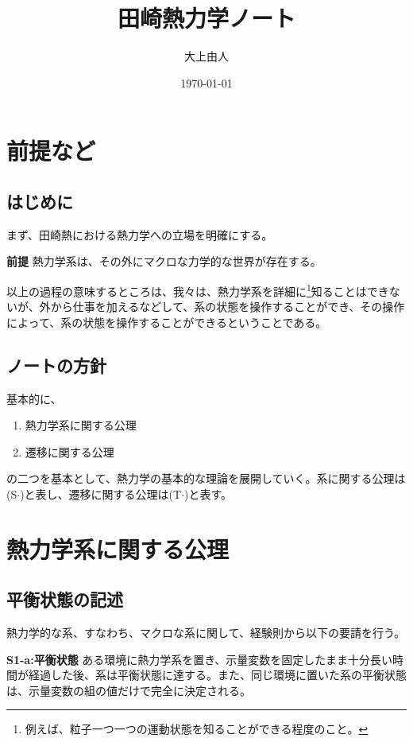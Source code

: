\documentclass[a4paper,11pt]{jsarticle}
\numberwithin{equation}{section}
\begin{document}
\title{田崎熱力学ノート}
\author{大上由人}
\date{\today}
\maketitle

\tableofcontents

\newpage

\section{前提など}
\subsection{はじめに}
まず、田崎熱における熱力学への立場を明確にする。\\
\begin{itembox}[l]{\textbf{前提}}
    熱力学系は、その外にマクロな力学的な世界が存在する。

\end{itembox}
以上の過程の意味するところは、我々は、熱力学系を詳細に\footnote[1]{例えば、粒子一つ一つの運動状態を知ることができる程度のこと。}知ることはできないが、外から仕事を加えるなどして、系の状態を操作することができ、その操作によって、系の状態を操作することができるということである。\\

\subsection{ノートの方針}
基本的に、
\begin{enumerate}
    \item 熱力学系に関する公理
    \item 遷移に関する公理
\end{enumerate}
の二つを基本として、熱力学の基本的な理論を展開していく。系に関する公理は(S$\cdot$)と表し、遷移に関する公理は(T$\cdot$)と表す。\\

\section{熱力学系に関する公理}

\subsection{平衡状態の記述}
熱力学的な系、すなわち、マクロな系に関して、経験則から以下の要請を行う。\\
\begin{itembox}[l]{\textbf{S1-a:平衡状態}}
    ある環境に熱力学系を置き、示量変数を固定したまま十分長い時間が経過した後、系は平衡状態に達する。また、同じ環境に置いた系の平衡状態は、示量変数の組の値だけで完全に決定される。
\end{itembox}
\end{document}
